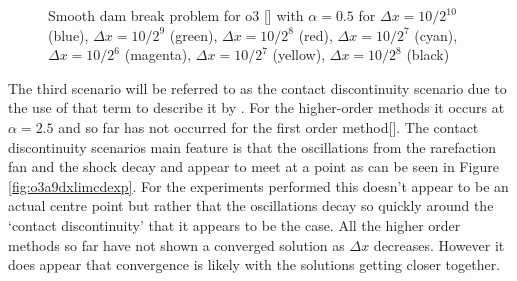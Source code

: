 \documentclass[SingleSpace,12pt,Proceedings]{Serre_ASCE}
\begin{document}
\begin{figure}
\centering
\caption{Smooth dam break problem for o3 [] with $\alpha = 0.5$ for $\Delta x = 10/2^{10}$ (blue), $\Delta x = 10/2^9$ (green), $\Delta x = 10/2^8$ (red), $\Delta x = 10/2^7$ (cyan), $\Delta x = 10/2^6$ (magenta), $\Delta x = 10/2^7$ (yellow), $\Delta x = 10/2^{8}$ (black)}
\label{fig:o3a6dxlimflatexp}
\end{figure}

The third scenario will be referred to as the contact discontinuity scenario due to the use of that term to describe it by . For the higher-order methods it occurs at $\alpha = 2.5$ and so far has not occurred for the first order method[]. The contact discontinuity scenarios main feature is that the oscillations from the rarefaction fan and the shock decay and appear to meet at a point as can be seen in Figure \ref{fig:o3a9dxlimcdexp}. For the experiments performed this doesn't appear to be an actual centre point but rather that the oscillations decay so quickly around the `contact discontinuity' that it appears to be the case. All the higher order methods so far have not shown a converged solution as $\Delta x$ decreases. However it does appear that convergence is likely with the solutions getting closer together. 
\end{document}
